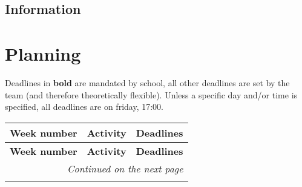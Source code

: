 \documentclass{article}
\begin{document}
\subsection{Information}


\newpage
\section{Planning}
Deadlines in \textbf{bold} are mandated by school, all other deadlines are set by the team (and therefore theoretically flexible).
Unless a specific day and/or time is specified, all deadlines are on friday, 17:00.
\begin{longtable}{|l|p{}|p{}|}
    \hline
    \textbf{Week number} & \textbf{Activity}                         & \textbf{Deadlines}                      \\ \hline
    \endfirsthead

    \hline
    \textbf{Week number} & \textbf{Activity}                         & \textbf{Deadlines}                      \\ \hline
    \endhead

    \hline \multicolumn{3}{r}{\textit{Continued on the next page}}                                             \\ \hline
    \endfoot

    \hline
    \endlastfoot


\end{longtable}
\end{document}
